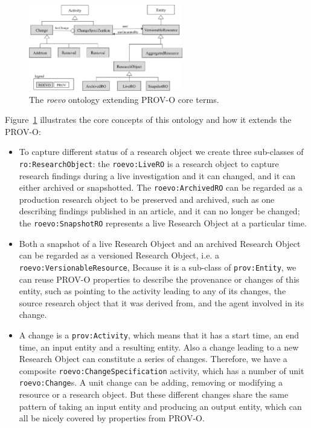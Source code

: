 \begin{figure}[ht]
  \centering
  \includegraphics[width=0.6\textwidth]{Figures/roevo.png}
  \caption{The \textit{roevo} ontology extending PROV-O core terms.}
  \label{fig:ro_evo}
\end{figure}    

Figure~\ref{fig:ro_evo} illustrates the core concepts of this ontology and how it extends the PROV-O:
\begin{itemize}
\item To capture different status of a research object we create three sub-classes of \texttt{ro:ResearchObject}: the \texttt{roevo:LiveRO} is a research object to capture research findings during a live investigation and it can changed, and it can either archived or snapshotted. The \texttt{roevo:ArchivedRO} can be regarded as a production research object to be preserved and archived, such as one describing findings published in an article, and it can no longer be changed; the \texttt{roevo:SnapshotRO} represents a live Research Object at a particular time.
\item Both a snapshot of a live Research Object and an archived Research Object can be regarded as a versioned Research Object, i.e. a \texttt{roevo:VersionableResource}, Because it is a sub-class of \texttt{prov:Entity}, we can reuse PROV-O properties to describe the provenance or changes of this entity, such as pointing to the activity leading to any of its changes, the source research object that it was derived from, and the agent involved in its change.
\item A change is a \texttt{prov:Activity}, which means that it has a start time, an end time, an input entity and a resulting entity. Also a change leading to a new Research Object can constitute a series of changes. Therefore, we have a composite \texttt{roevo:ChangeSpecification} activity, which has a number of unit \texttt{roevo:Change}s. A unit change can be adding, removing or modifying a resource or a research object. But these different changes share the same pattern of taking an input entity and producing an output entity, which can all be nicely covered by properties from PROV-O.
\end{itemize}

